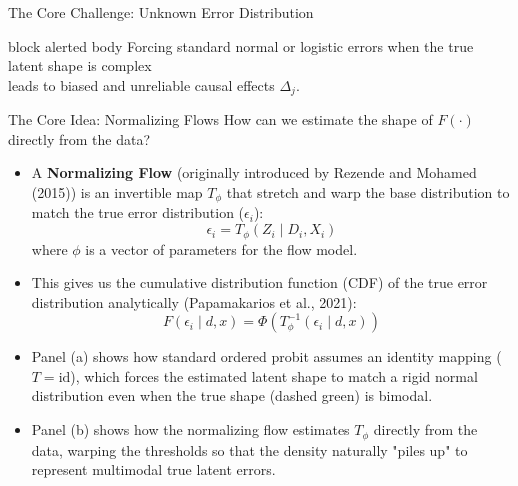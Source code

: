 \documentclass[final]{beamer}
\newlength{\colwidth}
\newcommand{\keybox}[1]{%
\begin{beamercolorbox}[rounded=true,shadow=false,sep=0.65em,wd=\linewidth]{block alerted body}
\centering #1
\end{beamercolorbox}}
\begin{document}
\begin{frame}[t]
\begin{columns}[t,totalwidth=0.995\paperwidth]
\begin{column}{\colwidth}
\begin{block}{The Core Challenge: Unknown Error Distribution}
\vspace{0.4cm}
\vspace{0.4cm}
\keybox{Forcing standard normal or logistic errors when the true latent shape is complex  \\ leads to biased and unreliable causal effects $\Delta_j$.}
\end{block}

\begin{block}{The Core Idea: Normalizing Flows}
\justifying
How can we estimate the shape of $F(\cdot)$ directly from the data?

\vspace{0.3em}
\begin{itemize}\setlength\itemsep{0.2em}
    \item A \textbf{Normalizing Flow} (originally introduced by Rezende and Mohamed (2015)) is an invertible map $T_\phi$ that stretch and warp the base distribution to match the true error distribution ($\epsilon_i$):
  \[
  \epsilon_i = T_\phi(Z_i \mid D_i, X_i)
  \]
  where $\phi$ is a vector of parameters for the flow model.
  \item This gives us the cumulative distribution function (CDF) of the true error distribution analytically (Papamakarios et al., 2021):
  \[
  F(\epsilon_i \mid d, x) = \Phi\left( T_\phi^{-1}(\epsilon_{i} \mid d, x) \right)
  \]
  \item Panel (a) shows how standard ordered probit assumes an identity mapping ($T = \text{id}$), which forces the estimated latent shape to match a rigid normal distribution even when the true shape (dashed green) is bimodal.
  \item Panel (b) shows how the normalizing flow estimates $T_\phi$ directly from the data, warping the thresholds so that the density naturally "piles up" to represent multimodal true latent errors.
\end{itemize}

\vspace{0.6cm}
\begin{center}
\end{center}
\end{block}
\end{column}
\end{columns}
\end{frame}
\end{document}
